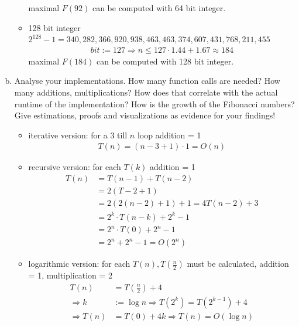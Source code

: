 \documentclass{article}
\begin{document}
\begin{flushleft}
\begin{enumerate}[(a)]
\begin{itemize}
        maximal $F(92)$ can be computed with 64 bit integer.
        \item 128 bit integer $2^{128} - 1 = 	340,282,366,920,938,463,463,374,607,431,768,211,455$
        \begin{align*}
            bit := 127 \Longrightarrow n \leq 127 \cdot 1.44 + 1.67 \approx 184
        \end{align*}
        maximal $F(184)$ can be computed with 128 bit integer.
    \end{itemize}
    \item Analyse your implementations. How many function calls are needed? How many additions,
    multiplications? How does that correlate with the actual runtime of the implementation?
    How is the growth of the Fibonacci numbers? Give estimations, proofs and visualizations as
    evidence for your findings!  
    \begin{itemize}
        \item iterative version: for a 3 till $n$ loop addition = 1
        \begin{align*}
            T(n) = (n - 3 + 1) \cdot 1 = O(n)
        \end{align*}
        \item recursive version: for each $T(k)$ addition = 1
        \begin{align*}
            T(n) &= T(n - 1) + T(n - 2) \\
            &= 2(T-2 + 1) \\
            &= 2(2(n - 2) + 1) + 1 = 4T(n - 2) + 3 \\
            &= 2^k \cdot T(n - k) + 2^k - 1 \\
            &= 2^n \cdot T(0) + 2^n - 1 \\
            &= 2^n + 2^n - 1 = O(2^n)
        \end{align*}
        \item logarithmic version: for each $T(n), T(\frac{n}{2})$ must be calculated, addition = 1, multiplication = 2 
        \begin{align*}
            T(n) &= T(\frac{n}{2}) + 4 \\
            \Longrightarrow k &:= \log n \Longrightarrow T(2^k) = T(2^ {k - 1}) + 4 \\ 
            \Longrightarrow T(n) &= T(0) + 4k \Longrightarrow T(n) = O(\log n)
        \end{align*}
    \end{itemize}
    \begin{figure}[H]
        \centering

\end{figure}
\end{enumerate}
\end{flushleft}
\end{document}
